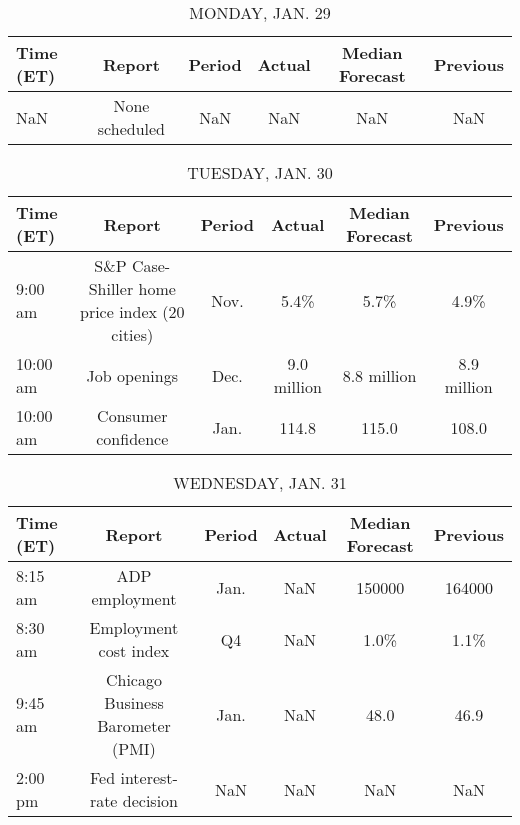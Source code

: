 \documentclass{article}%
\begin{document}
%
\normalsize%


\begin{table}[htbp]%
\caption{MONDAY, JAN. 29}%
\centering%
\begin{adjustbox}{width=1\textwidth}%
\begin{tabular}{lccccc}
\toprule
Time (ET) &         Report & Period & Actual & Median Forecast & Previous \\
\midrule
      NaN & None scheduled &    NaN &    NaN &             NaN &      NaN \\
\bottomrule
\end{tabular}
%
\end{adjustbox}%
\end{table}

%


\begin{table}[htbp]%
\caption{TUESDAY, JAN. 30}%
\centering%
\begin{adjustbox}{width=1\textwidth}%
\begin{tabular}{lccccc}
\toprule
Time (ET) &                                        Report & Period &      Actual & Median Forecast &    Previous \\
\midrule
  9:00 am & S\&P Case-Shiller home price index (20 cities) &   Nov. &        5.4\% &            5.7\% &        4.9\% \\
 10:00 am &                                  Job openings &   Dec. & 9.0 million &     8.8 million & 8.9 million \\
 10:00 am &                           Consumer confidence &   Jan. &       114.8 &           115.0 &       108.0 \\
\bottomrule
\end{tabular}
%
\end{adjustbox}%
\end{table}

%


\begin{table}[htbp]%
\caption{WEDNESDAY, JAN. 31}%
\centering%
\begin{adjustbox}{width=1\textwidth}%
\begin{tabular}{lccccc}
\toprule
Time (ET) &                           Report & Period & Actual & Median Forecast & Previous \\
\midrule
  8:15 am &                   ADP employment &   Jan. &    NaN &          150000 &   164000 \\
  8:30 am &            Employment cost index &     Q4 &    NaN &            1.0\% &     1.1\% \\
  9:45 am & Chicago Business Barometer (PMI) &   Jan. &    NaN &            48.0 &     46.9 \\
  2:00 pm &       Fed interest-rate decision &    NaN &    NaN &             NaN &      NaN \\
\bottomrule
\end{tabular}
%
\end{adjustbox}%
\end{table}
\end{document}
